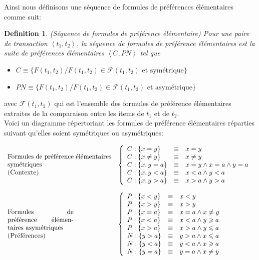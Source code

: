 \documentclass[a4paper,12pt,openany,oneside]{article}
\newtheorem{defn}{Definition} %
\begin{document}
Ainsi nous définisons une séquence de formules de préférences élémentaires comme suit:
\begin{defn}(Séquence de formules de préférence élémentaire)
Pour une paire de transaction $\left<t_1,t_2\right>$, la séquence de formules de préférence élémentaires est la suite de préférences élémentaires $\left< C,PN\right>$ tel que\\ 
\begin{itemize}
	\item	$C\equiv\{F(t_1,t_2)/F(t_1,t_2)\in \mathcal{F}(t_1,t_2)\text{ et  symétrique}\}$
	\item	$PN\equiv\{F(t_1,t_2)/F(t_1,t_2)\in \mathcal{F}(t_1,t_2)\text{ et  asymétrique}\}$
\end{itemize}
\end{defn}
avec $\mathcal{F}(t_1,t_2)$ qui est l'ensemble des formules de préférence élémentaires extraites de la comparaison entre les items de $t_1$ et de $t_2$.\\

Voici un diagramme répertoriant les formules de préférence élémentaires réparties suivant qu'elles soient symétriques ou asymétriques:


 
       \[
       \begin{array}{l l}
       \parbox{5.5cm}{Formules de préférence élémentaires symétriques\\ (Contexte)}&
 	  \left\{
 		  \begin{array}{l c l}
 		     C:\{x=y\}&\equiv& x=y\\
 		     C:\{x\neq y\}&\equiv& x\neq y\\
 		   	 C:\{x,y=a\}&\equiv& x=y\wedge x=a\wedge y=a\\
 		   	 C:\{x,y<a\}&\equiv& x<a\wedge y<a\\
 		   	 C:\{x,y>a\}&\equiv& x>a\wedge y>a
 	   	 \end{array}
    	 \right.\\
 	&\\
       \parbox{3.5cm}{Formules de préférence élémentaires asymétriques\\ (Préférences)}&
 	  \left\{
 		  \begin{array}{l c l}   	 
 		   	 P:\{x<y\}&\equiv& x<y\\
 		   	 P:\{x>y\}&\equiv& x>y\\
 		   	 P:\{x=a\} &\equiv& x=a \wedge x\neq y \\
 		   	 P:\{x<a\} &\equiv& x<a \wedge y\geqslant a\\
 			 P:\{x>a\} &\equiv& x>a \wedge y\leqslant a\\
 			 
 			 N:\{y>a\} &\equiv& y>a \wedge x\leqslant a\\
 			 N:\{y<a\} &\equiv& y<a \wedge x\geqslant a\\
 		   	 N:\{y=a\} &\equiv& y=a \wedge x\neq y\\	 
 	   	 \end{array}
    	 \right.
    	 \end{array}
    	 \]		  
\end{document}
